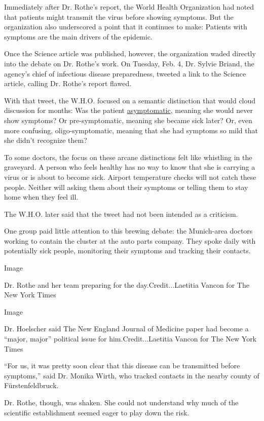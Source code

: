 Immediately after Dr. Rothe's report, the World Health Organization had
noted that patients might transmit the virus before showing symptoms.
But the organization also underscored a point that it continues to make:
Patients with symptoms are the main drivers of the epidemic.

Once the Science article was published, however, the organization waded
directly into the debate on Dr. Rothe's work. On Tuesday, Feb. 4, Dr.
Sylvie Briand, the agency's chief of infectious disease preparedness,
tweeted a link to the Science article, calling Dr. Rothe's report
flawed.

With that tweet, the W.H.O. focused on a semantic distinction that would
cloud discussion for months: Was the patient
\href{https://www.nytimes3xbfgragh.onion/2020/08/06/health/coronavirus-asymptomatic-transmission.html}{asymptomatic},
meaning she would never show symptoms? Or pre-symptomatic, meaning she
became sick later? Or, even more confusing, oligo-symptomatic, meaning
that she had symptoms so mild that she didn't recognize them?

To some doctors, the focus on these arcane distinctions felt like
whistling in the graveyard. A person who feels healthy has no way to
know that she is carrying a virus or is about to become sick. Airport
temperature checks will not catch these people. Neither will asking them
about their symptoms or telling them to stay home when they feel ill.

The W.H.O. later said that the tweet had not been intended as a
criticism.

One group paid little attention to this brewing debate: the Munich-area
doctors working to contain the cluster at the auto parts company. They
spoke daily with potentially sick people, monitoring their symptoms and
tracking their contacts.

Image

Dr. Rothe and her team preparing for the day.Credit...Laetitia Vancon
for The New York Times

Image

Dr. Hoelscher said The New England Journal of Medicine paper had become
a ``major, major'' political issue for him.Credit...Laetitia Vancon for
The New York Times

``For us, it was pretty soon clear that this disease can be transmitted
before symptoms,'' said Dr. Monika Wirth, who tracked contacts in the
nearby county of Fürstenfeldbruck.

Dr. Rothe, though, was shaken. She could not understand why much of the
scientific establishment seemed eager to play down the risk.

